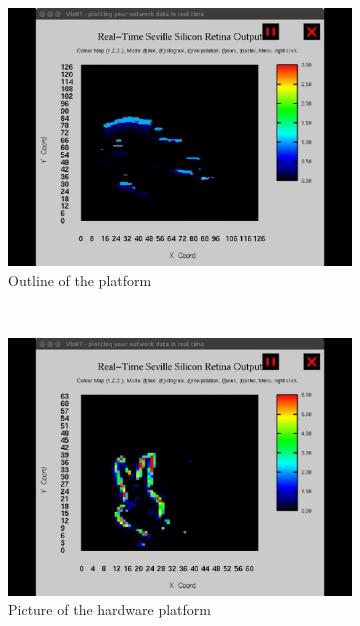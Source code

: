 \documentclass[journal]{journal}
\begin{document}
\begin{figure}
\centering
	\begin{subfigure}[t]{0.42\textwidth}
		\includegraphics[width=\textwidth]{pics/live1.png}
	    \caption{Outline of the platform}
	    \label{fig:live1}
	\end{subfigure}
	\\
	\begin{subfigure}[t]{0.42\textwidth}
		\includegraphics[width=\textwidth]{pics/live2.png}
		\caption{Picture of the hardware platform}
	    \label{fig:live2}
	\end{subfigure}
	\\
	\begin{subfigure}[t]{0.42\textwidth}

\end{subfigure}
\end{figure}
\end{document}
